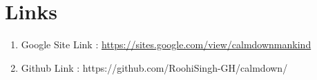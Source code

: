 \section{Links}
\begin{enumerate}
    \item Google Site Link :
\url{https://sites.google.com/view/calmdownmankind}
\item Github Link : https://github.com/RoohiSingh-GH/calmdown/
\end{enumerate}
